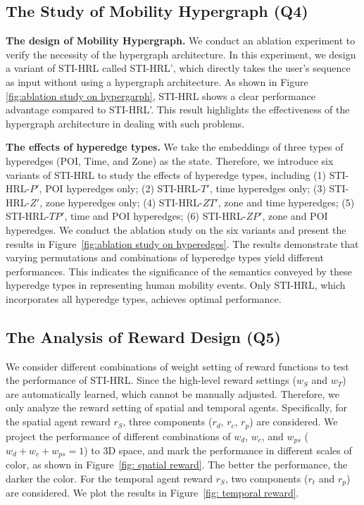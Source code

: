 \documentclass[letterpaper]{article} %
\begin{document}
\subsection{The Study of Mobility Hypergraph (Q4)}
\noindent \textbf{The design of Mobility Hypergraph.}
We conduct an ablation experiment to verify the necessity of the hypergraph architecture. In this experiment, we design a variant of STI-HRL called STI-HRL', which directly takes the user's sequence as input without using a hypergraph architecture. As shown in Figure \ref{fig:ablation study on hypergarph}, STI-HRL shows a clear performance advantage compared to STI-HRL'. This result highlights the effectiveness of the hypergraph architecture in dealing with such problems.

\noindent\textbf{The effects of hyperedge types.}
We take the embeddings of three types of hyperedges (POI, Time, and Zone) as the state.
Therefore, we introduce six variants of STI-HRL to study the effects of hyperedge types, including
(1) STI-HRL-$P'$, POI hyperedges only; (2) STI-HRL-$T'$, time hyperedges only; (3) STI-HRL-$Z'$, zone hyperedges only; (4) STI-HRL-$ZT'$, zone and time hyperedges; (5) STI-HRL-$TP'$, time and POI hyperedges; (6) STI-HRL-$ZP'$, zone and POI hyperedges.
We conduct the ablation study on the six variants and present the results in Figure~\ref{fig:ablation study on hyperedges}.
The results demonstrate that varying permutations and combinations of hyperedge types yield different performances.
This indicates the significance of the semantics conveyed by these hyperedge types in representing human mobility events.
Only STI-HRL, which incorporates all hyperedge types, achieves optimal performance.

\subsection{The Analysis of Reward Design (Q5)}
We consider different combinations of weight setting of reward functions to test the performance of STI-HRL.
Since the high-level reward settings ($w_S$ and $w_T$) are automatically learned, which cannot be manually adjusted.
Therefore, we only analyze the reward setting of spatial and temporal agents.
Specifically, for the spatial agent reward $r_S$, three components ($r_d$, $r_c$, $r_p$) are considered. We project the performance of different combinations of $w_d$, $w_c$, and $w_{ps}$ ($w_d+w_c+w_{ps}=1$) to 3D space, and mark the performance in different scales of color, as shown in Figure~\ref{fig: spatial reward}.
The better the performance, the darker the color.
For the temporal agent reward $r_S$, two components ($r_t$ and $r_p$) are considered.
We plot the results in Figure~\ref{fig: temporal reward}.
\end{document}
